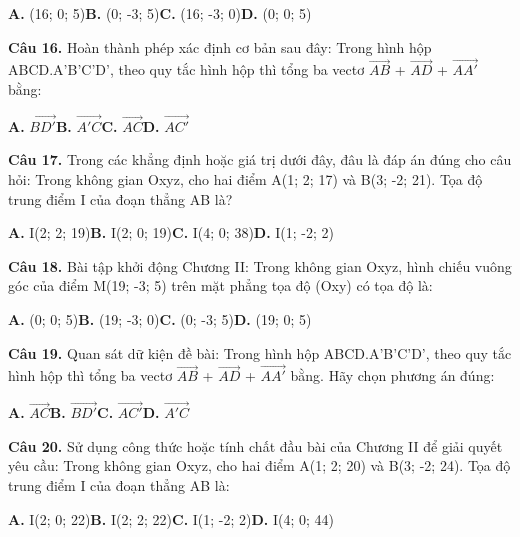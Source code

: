 \documentclass[11pt,a4paper]{article}
\begin{document}
\hspace*{1.5em}\textbf{A.} (16; 0; 5)\quad\quad \textbf{B.} (0; -3; 5)\quad\quad \textbf{C.} (16; -3; 0)\quad\quad \textbf{D.} (0; 0; 5)\par\vspace{2pt}
\textbf{\color{primary} Câu 16.} Hoàn thành phép xác định cơ bản sau đây: Trong hình hộp ABCD.A'B'C'D', theo quy tắc hình hộp thì tổng ba vectơ $\overrightarrow{AB}$ + $\overrightarrow{AD}$ + $\overrightarrow{AA'}$ bằng:\par
\hspace*{1.5em}\textbf{A.} $\overrightarrow{BD'}$\quad\quad \textbf{B.} $\overrightarrow{A'C}$\quad\quad \textbf{C.} $\overrightarrow{AC}$\quad\quad \textbf{D.} $\overrightarrow{AC'}$\par\vspace{2pt}
\textbf{\color{primary} Câu 17.} Trong các khẳng định hoặc giá trị dưới đây, đâu là đáp án đúng cho câu hỏi: Trong không gian Oxyz, cho hai điểm A(1; 2; 17) và B(3; -2; 21). Tọa độ trung điểm I của đoạn thẳng AB là?\par
\hspace*{1.5em}\textbf{A.} I(2; 2; 19)\quad\quad \textbf{B.} I(2; 0; 19)\quad\quad \textbf{C.} I(4; 0; 38)\quad\quad \textbf{D.} I(1; -2; 2)\par\vspace{2pt}
\textbf{\color{primary} Câu 18.} Bài tập khởi động Chương II: Trong không gian Oxyz, hình chiếu vuông góc của điểm M(19; -3; 5) trên mặt phẳng tọa độ (Oxy) có tọa độ là:\par
\hspace*{1.5em}\textbf{A.} (0; 0; 5)\quad\quad \textbf{B.} (19; -3; 0)\quad\quad \textbf{C.} (0; -3; 5)\quad\quad \textbf{D.} (19; 0; 5)\par\vspace{2pt}
\textbf{\color{primary} Câu 19.} Quan sát dữ kiện đề bài: Trong hình hộp ABCD.A'B'C'D', theo quy tắc hình hộp thì tổng ba vectơ $\overrightarrow{AB}$ + $\overrightarrow{AD}$ + $\overrightarrow{AA'}$ bằng. Hãy chọn phương án đúng:\par
\hspace*{1.5em}\textbf{A.} $\overrightarrow{AC}$\quad\quad \textbf{B.} $\overrightarrow{BD'}$\quad\quad \textbf{C.} $\overrightarrow{AC'}$\quad\quad \textbf{D.} $\overrightarrow{A'C}$\par\vspace{2pt}
\textbf{\color{primary} Câu 20.} Sử dụng công thức hoặc tính chất đầu bài của Chương II để giải quyết yêu cầu: Trong không gian Oxyz, cho hai điểm A(1; 2; 20) và B(3; -2; 24). Tọa độ trung điểm I của đoạn thẳng AB là:\par
\hspace*{1.5em}\textbf{A.} I(2; 0; 22)\quad\quad \textbf{B.} I(2; 2; 22)\quad\quad \textbf{C.} I(1; -2; 2)\quad\quad \textbf{D.} I(4; 0; 44)\par\vspace{2pt}
\end{document}
